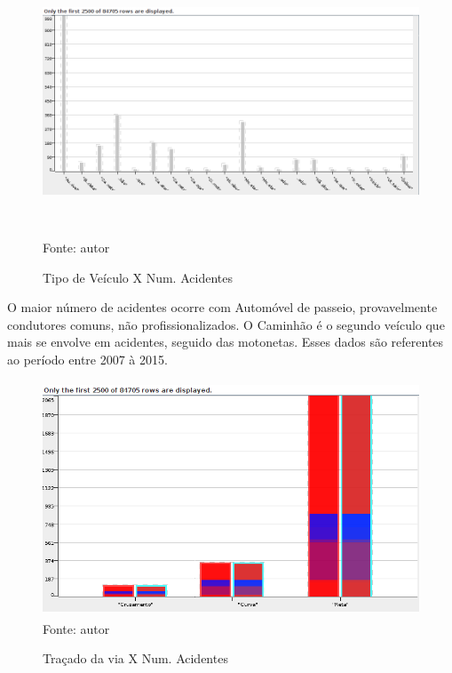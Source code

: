 \pagebreak

\begin{figure}[ht]
\begin{center}
\caption{Tipo de Veículo X Num. Acidentes}
\includegraphics[width=150mm, height=80mm]{Figuras/Preprocess/TipoVeiculoXNumAciden.png}\\
\tiny Fonte: autor
\end{center}
\end{figure}

O maior número de acidentes ocorre com Automóvel de passeio, provavelmente condutores comuns, não profissionalizados.
O Caminhão é o segundo veículo que mais se envolve em acidentes, seguido das motonetas. 
Esses dados são referentes ao período entre 2007 à 2015.

\begin{figure}[ht]
\begin{center}
\caption{Traçado da via X Num. Acidentes}
\includegraphics[width=120mm, height=70mm]{Figuras/Preprocess/TracadoViaNumAcident.png}\\
\tiny Fonte: autor
\end{center}
\end{figure}

